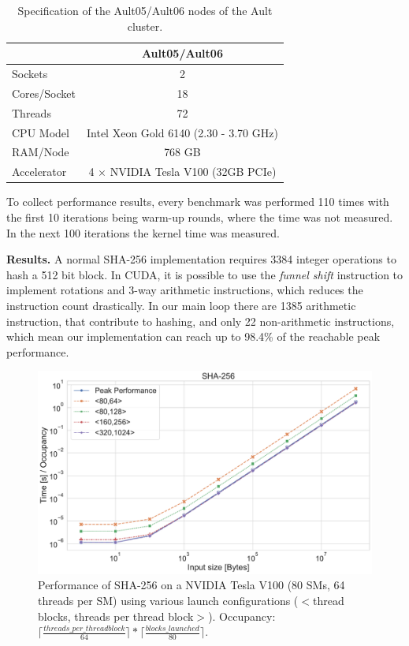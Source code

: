 \documentclass[letterpaper]{article}
\newcommand{\mypar}[1]{{\bf #1.}}
\begin{document}
\begin{table}[h]
\centering
\caption{Specification of the Ault05/Ault06 nodes of the Ault cluster.\label{table:Ault}}
\begin{tabularx}{\linewidth}{ l c }
\toprule
& Ault05/Ault06  \\
\midrule
Sockets & 2  \\
Cores/Socket & 18\\
Threads & 72 \\
CPU Model & Intel Xeon Gold 6140 (2.30 - 3.70 GHz)  \\
RAM/Node & 768 GB \\
Accelerator & 4 $\times$ NVIDIA Tesla V100 (32GB PCIe) \\
\bottomrule
\end{tabularx}
\end{table}

To collect performance results, every benchmark was performed 110 times with the first 10 iterations being warm-up rounds, where the time was not measured. In the next 100 iterations the kernel time was measured.

\mypar{Results}
A normal SHA-256 implementation requires 3384 integer operations to hash a 512 bit block.
In CUDA, it is possible to use the \emph{funnel shift} instruction to implement rotations and 3-way arithmetic instructions, which reduces the instruction count drastically. In our main loop there are 1385 arithmetic instruction, that contribute to hashing, and only 22 non-arithmetic instructions, which mean our implementation can reach up to 98.4\% of the reachable peak performance.

\begin{figure}[h]\centering
\includegraphics[scale=0.23]{plot_sha.pdf}
  \caption{Performance of SHA-256 on a NVIDIA Tesla V100 (80 SMs, 64 threads per SM) using various launch configurations ($<$thread blocks, threads per thread block$>$). Occupancy: $\lceil \frac{threads\_per\_threadblock}{ 64} \rceil * \lceil \frac{blocks\_launched}{  80} \rceil$.   \label{fig:sha256}}
\end{figure}
 
\end{document}

